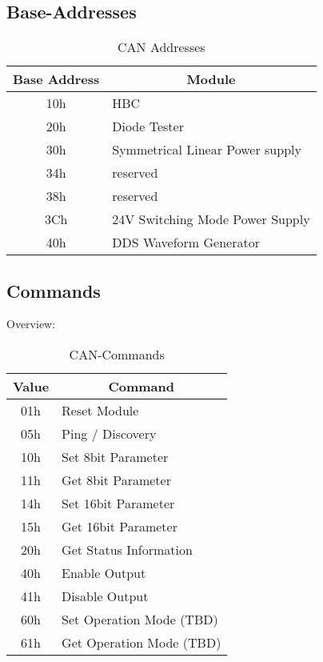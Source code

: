 \subsection{Base-Addresses}
\begin{table}[H]
    \centering
    \begin{tabular}{|c|l|}
        \hline
        \textbf{Base Address}   &   \multicolumn{1}{|c|}{\textbf{Module}}\\ \hline \hline
        10h    &   HBC    \\ \hline
        20h    &   Diode Tester \\ \hline
        30h    &   Symmetrical Linear Power supply \\ \hline
        34h    &   reserved \\ \hline
        38h    &   reserved \\ \hline
        3Ch    &   24V Switching Mode Power Supply \\\hline
        40h    &   DDS Waveform Generator \\ \hline
    \end{tabular}
    \caption{CAN Addresses}
    \label{tab:CAN-ADD}
\end{table}

\newpage

\subsection{Commands}
Overview:
\begin{table}[H]
    \centering
    \begin{tabular}{|c|l|}
        \hline
        \textbf{Value}   &   \multicolumn{1}{|c|}{\textbf{Command}}\\ \hline \hline \hline
        01h    &   Reset Module \\ \hline
        05h    &   Ping / Discovery \\ \hline
        \hline
        10h    &   Set 8bit Parameter    \\ \hline
        11h    &   Get 8bit Parameter     \\ \hline
        14h    &   Set 16bit Parameter   \\ \hline
        15h    &   Get 16bit Parameter    \\ \hline 
        \hline
        20h    &   Get Status Information \\ \hline 
        \hline
        40h    &   Enable Output       \\ \hline
        41h    &   Disable Output      \\ \hline 
        \hline
        60h    &   Set Operation Mode  (TBD)\\ \hline
        61h    &   Get Operation Mode  (TBD)\\ \hline 
    \end{tabular}
    \caption{CAN-Commands}
\label{tab:CAN-Commands}
\end{table}

